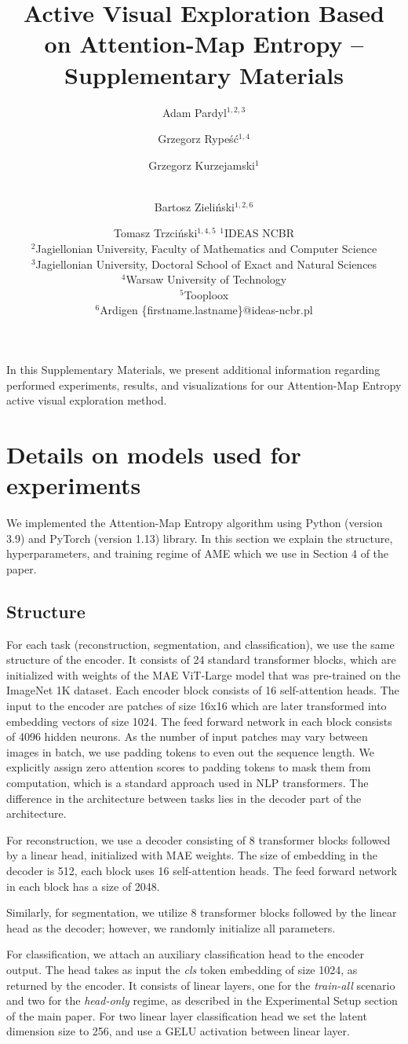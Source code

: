 \documentclass{article}
\title{Active Visual Exploration Based on Attention-Map Entropy -- Supplementary Materials}
\author{
Adam Pardyl$^{1,2,3}$\and
Grzegorz Rypeść$^{1,4}$\and
Grzegorz Kurzejamski$^1$\and \\
Bartosz Zieliński$^{1,2,6}$\and
Tomasz Trzciński$^{1,4,5}$
\affiliations
$^1$IDEAS NCBR\\
$^2$Jagiellonian University, Faculty of Mathematics and Computer Science\\
$^3$Jagiellonian University, Doctoral School of Exact and Natural Sciences\\
$^4$Warsaw University of Technology\\
$^5$Tooploox\\
$^6$Ardigen
\emails
\{firstname.lastname\}@ideas-ncbr.pl
}
\begin{document}
\maketitle

In this Supplementary Materials, we present additional information regarding performed experiments, results, and visualizations for our Attention-Map Entropy active visual exploration method. 

\section{Details on models used for experiments}
We implemented the Attention-Map Entropy algorithm using Python (version 3.9) and PyTorch (version 1.13) library. In this section we explain the structure, hyperparameters, and training regime of AME which we use in Section 4 of the paper.

\subsection{Structure}
 For each task (reconstruction, segmentation, and classification), we use the same structure of the encoder. It consists of 24 standard transformer blocks, which are initialized with weights of the MAE ViT-Large model that was pre-trained on the ImageNet 1K dataset. Each encoder block consists of 16 self-attention heads. The input to the encoder are patches of size 16x16 which are later transformed into embedding vectors of size 1024. The feed forward network in each block consists of 4096 hidden neurons. As the number of input patches may vary between images in batch, we use padding tokens to even out the sequence length. We explicitly assign zero attention scores to padding tokens to mask them from computation, which is a standard approach used in NLP transformers. The difference in the architecture between tasks lies in the decoder part of the architecture.

For reconstruction, we use a decoder consisting of 8 transformer blocks followed by a linear head, initialized with MAE weights. The size of embedding in the decoder is 512, each block uses 16 self-attention heads. The feed forward network in each block has a size of 2048.

Similarly, for segmentation, we utilize 8 transformer blocks followed by the linear head as the decoder; however, we randomly initialize all parameters.

For classification, we attach an auxiliary classification head to the encoder output. The head takes as input the \textit{cls} token embedding of size 1024, as returned by the encoder. It consists of linear layers, one for the \textit{train-all} scenario and two for the \textit{head-only} regime, as described in the Experimental Setup section of the main paper. For two linear layer classification head we set the latent dimension size to 256, and use a GELU activation between linear layer.
\end{document}
